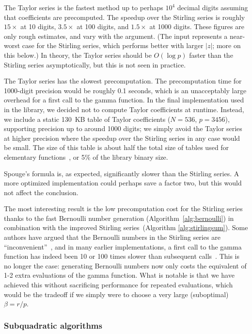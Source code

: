 \documentclass[reqno]{amsart}
\theoremstyle{definition}
\begin{document}
The Taylor series is the fastest method up to
perhaps $10^4$ decimal digits assuming that coefficients are precomputed.
The speedup over the Stirling series is roughly $15\times$
at 10 digits, $3.5\times$ at 100 digits, and $1.5\times$ at 1000 digits.
These figures are only rough estimates, and vary with the argument.
(The input represents a near-worst case
for the Stirling series, which performs
better with larger $|z|$; more on this below.)
In theory, the Taylor series should be $O(\log p)$
faster than the Stirling series asymptotically, but this is not
seen in practice.

The Taylor series has the slowest precomputation.
The precomputation time for 1000-digit precision would be roughly 0.1 seconds,
which is an unacceptably large overhead for a first call to the gamma function.
In the final implementation used in the library,
we decided not to compute Taylor coefficients at runtime.
Instead, we include a static 130~KB table of Taylor coefficients
($N = 536$, $p = 3456$), supporting precision up to around 1000 digits;
we simply avoid the Taylor series at higher precision
where the speedup over the Stirling series in any case would be small.
The size of this table is about half the total size of
tables used for elementary functions~\cite{Johansson2015elementary},
or 5\% of the library binary size.

Spouge's formula is, as expected, significantly slower than the Stirling
series. A more optimized implementation could perhaps
save a factor two, but this would not affect the conclusion.

The most interesting result is the low precomputation cost for
the Stirling series thanks to
the fast Bernoulli number generation (Algorithm~\ref{alg:bernoulli})
in combination with the improved Stirling series~(Algorithm \ref{alg:stirlingsum}).
Some authors have
argued that the Bernoulli numbers in the Stirling series are ``inconvenient''~\cite{smith2006gamma},
and in many earlier implementations, a first call to the gamma function
has indeed been 10 or 100 times slower than subsequent calls~\cite{laurie2005,Johansson2014rectangular}.
This is no longer the case: generating Bernoulli numbers now only costs
the equivalent of 1-2 extra evaluations of the gamma function.
What is notable is that we have achieved this without
sacrificing performance for repeated evaluations, which would be the tradeoff if we simply were to choose a very large (suboptimal) $\beta = r / p$.

\subsubsection*{Subquadratic algorithms}
\end{document}
